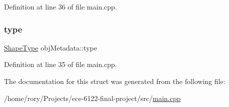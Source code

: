 Definition at line 36 of file main.\+cpp.

\mbox{\label{structobj_metadata_af6153058d69f26848a28eeae724d8f05}} 
\subsubsection{\texorpdfstring{type}{type}}
{\footnotesize\ttfamily \hyperlink{main_8cpp_a5a4538eeab397888d88a4eefcc5a1345}{Shape\+Type} obj\+Metadata\+::type}



Definition at line 35 of file main.\+cpp.



The documentation for this struct was generated from the following file\+:\begin{DoxyCompactItemize}
\item 
/home/rory/\+Projects/ece-\/6122-\/final-\/project/src/\hyperlink{main_8cpp}{main.\+cpp}\end{DoxyCompactItemize}
